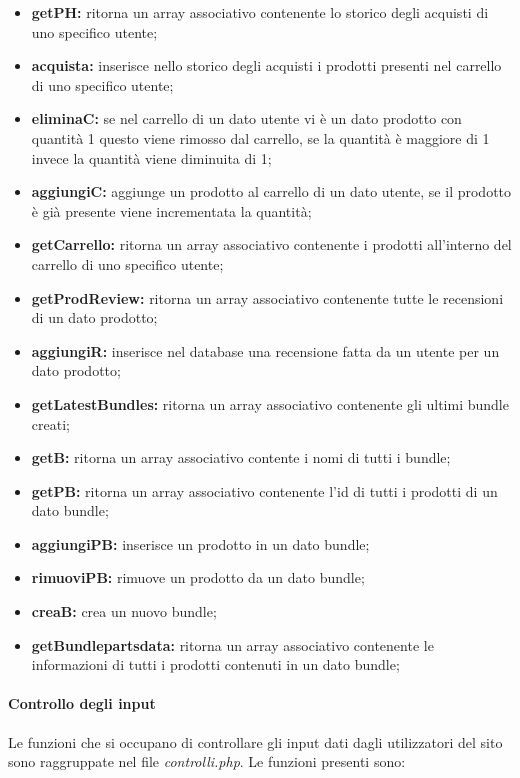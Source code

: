 \begin{itemize}
	\item \textbf{getPH:} ritorna un array associativo contenente lo storico degli acquisti di uno specifico utente;
	\item \textbf{acquista:} inserisce nello storico degli acquisti i prodotti presenti nel carrello di uno specifico utente;
	\item \textbf{eliminaC:} se nel carrello di un dato utente vi è un dato prodotto con quantità 1 questo viene rimosso dal carrello, se la quantità è maggiore di 1 invece la quantità viene diminuita di 1;
	\item \textbf{aggiungiC:} aggiunge un prodotto al carrello di un dato utente, se il prodotto è già presente viene incrementata la quantità;
    \item \textbf{getCarrello:} ritorna un array associativo contenente i prodotti all'interno del carrello di uno specifico utente;
	\item \textbf{getProdReview:} ritorna un array associativo contenente tutte le recensioni di un dato prodotto;
	\item \textbf{aggiungiR:} inserisce nel database una recensione fatta da un utente per un dato prodotto;
	\item \textbf{getLatestBundles:} ritorna un array associativo contenente gli ultimi bundle creati; 
	\item \textbf{getB:} ritorna un array associativo contente i nomi di tutti i bundle;
	\item \textbf{getPB:} ritorna un array associativo contenente l'id di tutti i prodotti di un dato bundle;
	\item \textbf{aggiungiPB:} inserisce un prodotto in un dato bundle;
	\item \textbf{rimuoviPB:} rimuove un prodotto da un dato bundle;
	\item \textbf{creaB:} crea un nuovo bundle;
	\item \textbf{getBundlepartsdata:} ritorna un array associativo contenente le informazioni di tutti i prodotti contenuti in un dato bundle;
\end{itemize}

\paragraph{Controllo degli input} \Spazio
Le funzioni che si occupano di controllare gli input dati dagli utilizzatori del sito sono raggruppate nel file \textit{controlli.php}.\newline
Le funzioni presenti sono:


